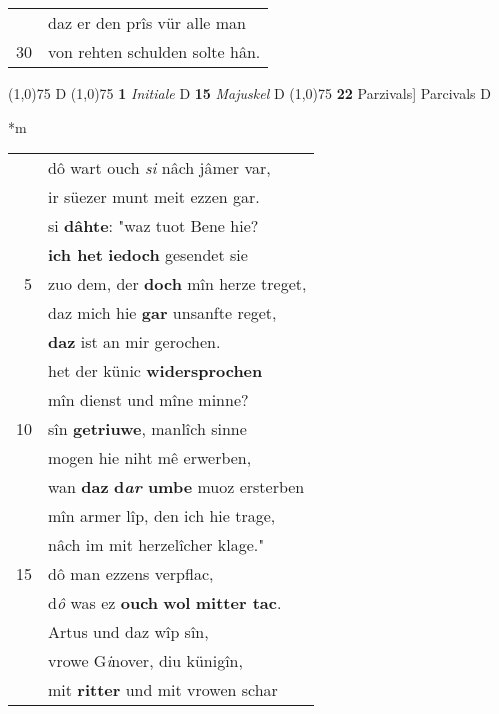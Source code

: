 \documentclass[8pt,a4paper,notitlepage]{article}
\begin{document}
\begin{table}[ht]
\begin{minipage}[t]{0.5\linewidth}
\begin{tabular}{rl}
 & daz er den prîs vür alle man\\ 
30 & von rehten schulden solte hân.\\ 
\end{tabular}
\scriptsize
\line(1,0){75} \newline
D \newline
\line(1,0){75} \newline
\textbf{1} \textit{Initiale} D  \textbf{15} \textit{Majuskel} D  \newline
\line(1,0){75} \newline
\textbf{22} Parzivals] Parcivals D \newline
\end{minipage}
\hspace{0.5cm}
\begin{minipage}[t]{0.5\linewidth}
\small
\begin{center}*m
\end{center}
\begin{tabular}{rl}
 & dô wart ouch \textit{si} nâch jâmer var,\\ 
 & ir süezer munt meit ezzen gar.\\ 
 & si \textbf{dâhte}: "waz tuot Bene hie?\\ 
 & \textbf{ich het} \textbf{iedoch} gesendet sie\\ 
5 & zuo dem, der \textbf{doch} mîn herze treget,\\ 
 & daz mich hie \textbf{gar} unsanfte reget,\\ 
 & \textbf{daz} ist an mir gerochen.\\ 
 & het der künic \textbf{widersprochen}\\ 
 & mîn dienst und mîne minne?\\ 
10 & sîn \textbf{getriuwe}, manlîch sinne\\ 
 & mogen hie niht mê erwerben,\\ 
 & wan \textbf{daz} \textbf{d\textit{ar} umbe} muoz ersterben\\ 
 & mîn armer lîp, den ich hie trage,\\ 
 & nâch im mit herzelîcher klage."\\ 
15 & dô man ezzens verpflac,\\ 
 & d\textit{ô} was ez \textbf{ouch} \textbf{wol} \textbf{mitter tac}.\\ 
 & Artus und daz wîp sîn,\\ 
 & vrowe G\textit{i}nover, diu künigîn,\\ 
 & mit \textbf{ritter} und mit vrowen schar\\ 

\end{tabular}
\end{minipage}
\end{table}
\end{document}
